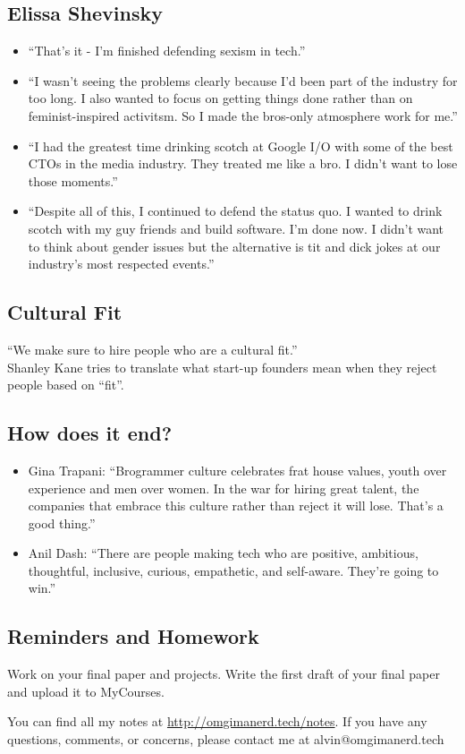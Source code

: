 \documentclass[letterpaper, 12pt]{article}
\begin{document}
\subsection*{Elissa Shevinsky}
\begin{itemize}
  \item ``That's it - I'm finished defending sexism in tech.''
  \item ``I wasn't seeing the problems clearly because I'd been part of the
    industry for too long. I also wanted to focus on getting things done
    rather than on feminist-inspired activitsm. So I made the bros-only
    atmosphere work for me.''
  \item ``I had the greatest time drinking scotch at Google I/O with some of
    the best CTOs in the media industry. They treated me like a bro. I didn't
    want to lose those moments.''
  \item ``Despite all of this, I continued to defend the status quo. I wanted
    to drink scotch with my guy friends and build software. I'm done now. I
    didn't want to think about gender issues but the alternative is tit and
    dick jokes at our industry's most respected events.''
\end{itemize}

\subsection*{Cultural Fit}
``We make sure to hire people who are a cultural fit.'' \\
Shanley Kane tries to translate what start-up founders mean when they reject
people based on ``fit''.

\subsection*{How does it end?}
\begin{itemize}
  \item Gina Trapani: ``Brogrammer culture celebrates frat house values,
    youth over experience and men over women. In the war for hiring great
    talent, the companies that embrace this culture rather than reject it will
    lose. That's a good thing.''
  \item Anil Dash: ``There are people making tech who are positive, ambitious,
    thoughtful, inclusive, curious, empathetic, and self-aware. They're going
    to win.''
\end{itemize}

\subsection*{Reminders and Homework}
Work on your final paper and projects. Write the first draft of your final
paper and upload it to MyCourses.

\begin{center}
  You can find all my notes at \url{http://omgimanerd.tech/notes}. If you have
  any questions, comments, or concerns, please contact me at
  alvin@omgimanerd.tech
\end{center}
\end{document}
